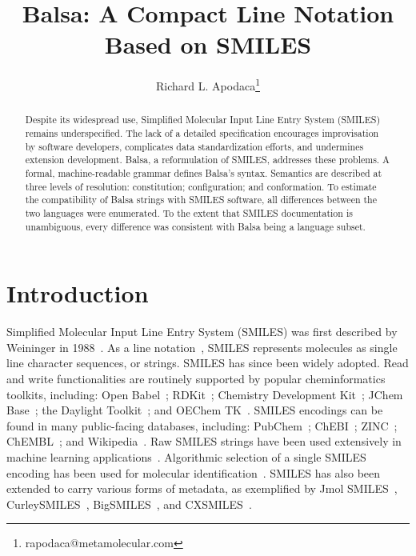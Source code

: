 \documentclass{article}
\begin{document}
\lstset{basicstyle=\ttfamily,breaklines=true}

\title{Balsa: A Compact Line Notation Based on SMILES}
\author{Richard L. Apodaca\thanks{rapodaca@metamolecular.com}}

\maketitle

\begin{abstract}
Despite its widespread use, Simplified Molecular Input Line Entry System (SMILES) remains underspecified. The lack of a detailed specification encourages improvisation by software developers, complicates data standardization efforts, and undermines extension development. Balsa, a reformulation of SMILES, addresses these problems. A formal, machine-readable grammar defines Balsa's syntax. Semantics are described at three levels of resolution: constitution; configuration; and conformation. To estimate the compatibility of Balsa strings with SMILES software, all differences between the two languages were enumerated. To the extent that SMILES documentation is unambiguous, every difference was consistent with Balsa being a language subset.
\end{abstract}

\section*{Introduction}

Simplified Molecular Input Line Entry System (SMILES) was first described by Weininger in 1988~\cite{weininger:1988}. As a line notation~\cite{wiswesser:1968}, SMILES represents molecules as single line character sequences, or strings. SMILES has since been widely adopted. Read and write functionalities are routinely supported by popular cheminformatics toolkits, including: Open Babel~\cite{oBoyle:2011}; RDKit~\cite{rdkit}; Chemistry Development Kit~\cite{steinbeck:2003}; JChem Base~\cite{jchemBase}; the Daylight Toolkit~\cite{daylightToolkit}; and OEChem TK~\cite{oetk}. SMILES encodings can be found in many public-facing databases, including: PubChem~\cite{kim:2016}; ChEBI~\cite{degtyarenko:2007}; ZINC~\cite{irwin:2005}; ChEMBL~\cite{gaulton:2012}; and Wikipedia~\cite{wikipediaCAS}. Raw SMILES strings have been used extensively in machine learning applications~\cite{sousa:2021}. Algorithmic selection of a single SMILES encoding has been used for molecular identification~\cite{weininger:1989,oBoyle:2012}. SMILES has also been extended to carry various forms of metadata, as exemplified by Jmol SMILES~\cite{hanson:2016}, CurleySMILES~\cite{drefahl:2011}, BigSMILES~\cite{lin:2019}, and CXSMILES~\cite{cxsmiles}.
\end{document}
